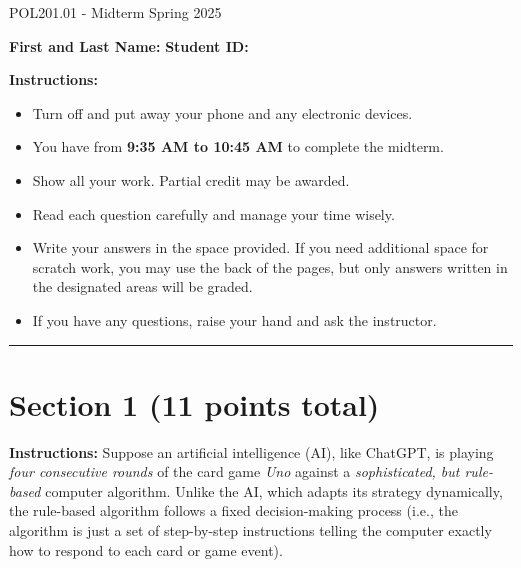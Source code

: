 \documentclass{article}
\begin{document}
 \hspace{1em} \vspace{-1.7em}
\begin{center}
   \Large   POL201.01 - Midterm Spring 2025
\end{center}

\vspace{1em}
\noindent\textbf{First and Last Name:} \underline{\hspace{8cm}}  \quad  \textbf{Student ID:} \underline{\hspace{4.4cm}} 

\vspace{0.7em}
\noindent\textbf{Instructions:} 

\vspace{-0.8em}
\begin{itemize}
    \setlength{\itemsep}{-0.35em}
    \item Turn off and put away your phone and any electronic devices.
    \item You have from \textbf{9:35 AM to 10:45 AM} to complete the midterm.
    \item Show all your work. Partial credit may be awarded.
    \item Read each question carefully and manage your time wisely.
    \item Write your answers in the space provided. If you need additional space for scratch work, you may use the back of the pages, but only answers written in the designated areas will be graded.
    \item If you have any questions, raise your hand and ask the instructor.
\end{itemize}
\vspace{-1.1em}
\noindent\rule{\linewidth}{0.4pt} %

\section*{Section 1 (11 points total)}

\noindent\textbf{Instructions:}  
Suppose an artificial intelligence (AI), like ChatGPT, is playing \emph{four consecutive rounds} of the card game \emph{Uno} against a \emph{sophisticated, but rule-based} computer algorithm. Unlike the AI, which adapts its strategy dynamically, the rule-based algorithm follows a fixed decision-making process (i.e., the algorithm is just a set of step-by-step instructions telling the computer exactly how to respond to each card or game event).
\end{document}
